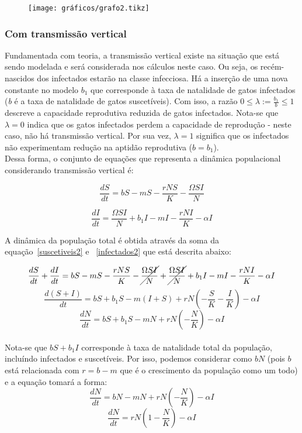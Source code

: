 \documentclass{article}
\begin{document}
\begin{figure}[!ht]
\centering
\texttt{[image: gráficos/grafo2.tikz]}
\end{figure}
 
\subsubsection{Com transmissão vertical}
Fundamentada com teoria, a transmissão vertical existe na situação que está sendo modelada e será considerada nos cálculos neste caso. Ou seja, 
os recém-nascidos dos infectados estarão na classe infecciosa. Há a inserção de uma nova constante no modelo {\it $b_1$} que corresponde à taxa de natalidade de gatos infectados ({\it b} é a taxa de natalidade de gatos suscetíveis). Com isso, a razão $0 \leq \lambda := \frac{b_1}{b} \leq 1$ descreve a capacidade reprodutiva reduzida de
gatos infectados. Nota-se que $\lambda = 0$ indica que os gatos infectados perdem a capacidade de reprodução - neste caso, não há transmissão vertical. Por sua vez, $\lambda = 1$ significa que os infectados não experimentam redução na aptidão reprodutiva ($b = b_1$).\\

\noindent Dessa forma, o conjunto de equações que representa a dinâmica populacional considerando transmissão vertical é:

\begin{equation} \label{suscetiveis2}
 \frac{dS}{dt}=bS - mS - \frac{rNS}{K} - \frac{\Omega SI}{N}
\end{equation}

\begin{equation} \label{infectados2}
 \frac{dI}{dt}=  \frac{\Omega SI}{N} + b_1I - mI - \frac{rNI}{K} - \alpha I
\end{equation}

\noindent A dinâmica da população total é obtida através da soma da equação~\ref{suscetiveis2} e ~\ref{infectados2} que está descrita abaixo:

$$\frac{dS}{dt} + \frac{dI}{dt} = bS - mS - \frac{rNS}{K} - \cancel{\frac{\Omega SI}{N}} + \cancel{\frac{\Omega SI}{N}} + b_1I - mI - \frac{rNI}{K} - \alpha I $$
$$\frac{d(S + I)}{dt} = bS + b_1S -m(I + S) + rN(-\frac{S}{K} -\frac{I}{K}) - \alpha I $$
$$\frac{dN}{dt} = bS + b_1S -mN + rN(-\frac{N}{K}) - \alpha I $$\\

\noindent Nota-se que $bS + b_1I$ corresponde à taxa de natalidade total da população, incluíndo infectados e suscetíveis. Por isso, podemos considerar como $bN$ (pois $b$ está relacionada com $r = b- m$ que é o crescimento da população como um todo) e a equação tomará a forma:
$$ \frac{dN}{dt} = bN - mN + rN(-\frac{N}{K}) - \alpha I $$
$$ \frac{dN}{dt} = rN(1 - \frac{N}{K}) - \alpha I $$
\end{document}
